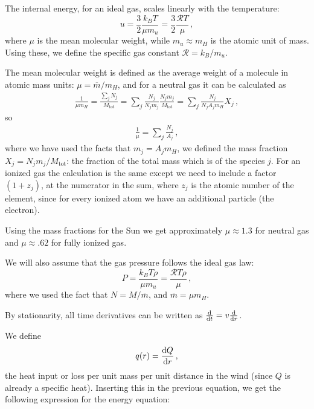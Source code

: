 \documentclass[main.tex]{subfiles}
\begin{document}
The internal energy, for an ideal gas, scales linearly with the temperature: 
%
\begin{equation}
  u = \frac{3}{2} \frac{k_B T}{\mu m_u} = \frac{3}{2} \frac{\mathcal{R} T}{\mu }
\,,
\end{equation}
%
where \(\mu \) is the mean molecular weight, while \(m_u \approx m_H\) is the atomic unit of mass. Using these, we define the specific gas constant \(\mathcal{R} = k_B / m_u\).

\begin{bluebox}
The mean molecular weight is defined as the average weight of a molecule in atomic mass units: \(\mu = \overline{m} / m_H\), and for a neutral gas it can be calculated as 
%
\begin{align}
\frac{1}{\mu m_H} = \frac{\sum _{j} N_j}{M _{\text{tot}}} =
\sum _{j} \frac{N_j}{N_j m_j} \frac{N_j m_j}{M _{\text{tot}}}
= \sum _{j} \frac{N_j}{N_j A_j m_H} X_j 
\,,
\end{align}
%
so 
%
\begin{align}
\frac{1}{\mu } = \sum _{j} \frac{N_j}{A_j}
\,,
\end{align}
%
where we have used the facts that \(m_j = A_j m_H\), we defined the mass fraction \(X_j = N_j m_j / M _{\text{tot}}\): the fraction of the total mass which is of the species \(j\). 
For an ionized gas the calculation is the same except we need to include a factor \((1+z_j)\), at the numerator in the sum, where \(z_j\) is the atomic number of the element, since for every ionized atom we have an additional particle (the electron).

Using the mass fractions for the Sun we get approximately \(\mu \approx 1.3\) for neutral gas and \(\mu \approx \num{.62}\) for fully ionized gas.
\end{bluebox}

We will also assume that the gas pressure follows the ideal gas law: 
%
\begin{equation}
  P = \frac{k_B T \rho }{\mu m_u} = \frac{\mathcal{R} T \rho }{\mu }
\,,
\end{equation}
%
where we used the fact that \(N = M / \overline{m}\), and \(\overline{m} = \mu m_H\). 

By stationarity, all time derivatives can be written as \(\dv{}{t} = v \dv{}{r} \).

We define 
%
\begin{equation}
  q(r) = \dv{Q}{r} 
\,,
\end{equation}
%
the heat input or loss per unit mass per unit distance in the wind (since \(Q\) is already a specific heat). Inserting this in the previous equation, we get the following expression for the energy equation:
%
%
\end{document}
